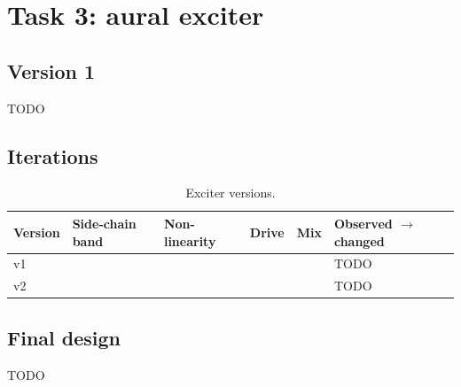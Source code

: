 \section{Task 3: aural exciter}

\subsection{Version 1}
TODO

\subsection{Iterations}
\begin{table}[h]
  \centering
  \begin{tabular}{@{}l l l l l p{5cm}@{}}
    \toprule
    Version & Side-chain band & Non-linearity & Drive & Mix & Observed $\to$ changed \\
    \midrule
    v1 &  &  &  &  & TODO \\
    v2 &  &  &  &  & TODO \\
    \bottomrule
  \end{tabular}
  \caption{Exciter versions.}
\end{table}

\subsection{Final design}
TODO
